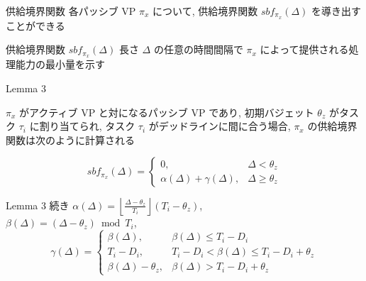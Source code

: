 
\begin{frame}{供給境界関数}
    各パッシブ VP $\pi_{x}$ について, 供給境界関数 $s b f_{\pi_{x}}(\Delta)$ を導き出すことができる
    \begin{block}{供給境界関数 $s b f_{\pi_{x}}(\Delta)$}
        長さ $\Delta$ の任意の時間間隔で $\pi_{x}$ によって提供される処理能力の最小量を示す
    \end{block}
\end{frame}

\begin{frame}[label=lemma3]{Lemma 3}
    \begin{lemma}[]
        $\pi_{x}$ がアクティブ VP と対になるパッシブ VP であり, 初期バジェット $\theta_{z}$ がタスク $\tau_{i}$ に割り当てられ, タスク $\tau_{i}$ がデッドラインに間に合う場合, $\pi_{x}$ の供給境界関数は次のように計算される

        \begin{equation*}
            s b f_{\pi_{x}}(\Delta)= \begin{cases}0, & \Delta<\theta_{z} \\ \alpha(\Delta)+\gamma(\Delta), & \Delta \geq \theta_{z}\end{cases}
        \end{equation*}
    \end{lemma}
\end{frame}

\begin{frame}{Lemma 3 続き}
    $\alpha(\Delta)=\left\lfloor\frac{\Delta-\theta_{z}}{T_{i}}\right\rfloor\left(T_{i}-\theta_{z}\right)$,\\
    $\beta(\Delta)=\left(\Delta-\theta_{z}\right) \bmod T_{i}$,
    \begin{equation*}
        \gamma(\Delta)=\left\{\begin{array}{lr}
            \beta(\Delta),            & \beta(\Delta) \leq T_{i}-D_{i}                        \\
            T_{i}-D_{i},              & T_{i}-D_{i}<\beta(\Delta) \leq T_{i}-D_{i}+\theta_{z} \\
            \beta(\Delta)-\theta_{z}, & \beta(\Delta)>T_{i}-D_{i}+\theta_{z}
        \end{array}\right.
    \end{equation*}
\end{frame}


